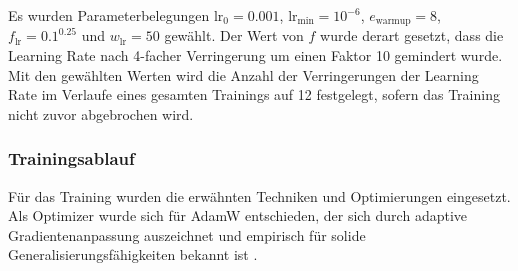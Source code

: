 Es wurden Parameterbelegungen $\text{lr}_0 = 0.001$, $\text{lr}_\text{min} = 10^{-6}$, $e_\text{warmup} = 8$, $f_\text{lr} = 0.1^{0.25}$ und $w_\text{lr} = 50$ gewählt. Der Wert von $f$ wurde derart gesetzt, dass die Learning Rate nach 4-facher Verringerung um einen Faktor 10 gemindert wurde. Mit den gewählten Werten wird die Anzahl der Verringerungen der Learning Rate im Verlaufe eines gesamten Trainings auf 12 festgelegt, sofern das Training nicht zuvor abgebrochen wird.

\subsubsection{Trainingsablauf}

Für das Training wurden die erwähnten Techniken und Optimierungen eingesetzt. Als Optimizer wurde sich für AdamW entschieden, der sich durch adaptive Gradientenanpassung auszeichnet und empirisch für solide Generalisierungsfähigkeiten bekannt ist \cite{adamw, adamw_good, adamw_good2, adamw_good3, adamw_good4}.



